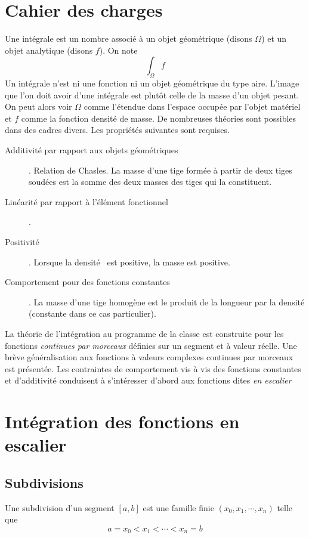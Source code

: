

\section{Cahier des charges}
Une intégrale est un nombre associé à un objet géométrique (disons $\Omega$) et un objet analytique (disons $f$). On note
\begin{displaymath}
 \int_{\Omega}f
\end{displaymath}
Un intégrale n'est ni une fonction ni un objet géométrique du type aire. L'image que l'on doit avoir d'une intégrale est plutôt celle de la masse d'un objet pesant. On peut alors voir $\Omega$ comme l'étendue dans l'espace occupée par l'objet matériel et $f$ comme la fonction densité de masse. De nombreuses théories sont possibles dans des cadres divers. Les propriétés suivantes sont requises.
\begin{description}
 \item[Additivité par rapport aux objets géométriques]. Relation de Chasles. La masse d'une tige formée à partir de deux tiges soudées est la somme des deux masses des tiges qui la constituent.
\item[Linéarité par rapport à l'élément fonctionnel].
\item[Positivité]. Lorsque la \og densité\fg~ est positive, la masse est positive.
\item[Comportement pour des fonctions constantes]. La masse d'une tige homogène est le produit de la longueur par la densité (constante dans ce cas particulier).
\end{description}
La théorie de l'intégration au programme de la classe est construite pour les fonctions \emph{continues par morceaux} définies sur un segment et à valeur réelle. Une brève généralisation aux fonctions à valeurs complexes continues par morceaux est présentée.\newline
Les contraintes de comportement vis à vis des fonctions constantes et d'additivité conduisent à s'intéresser d'abord aux fonctions dites \emph{en escalier}

\section{Intégration des fonctions en escalier}
\subsection{Subdivisions}
\begin{defi}[Subdivision]
 Une subdivision d'un segment $[a,b]$ est une famille finie $(x_0,x_1,\cdots,x_n)$ telle que 
\begin{displaymath} 
 a=x_0 < x_1 < \cdots < x_n=b
\end{displaymath}
\end{defi}


